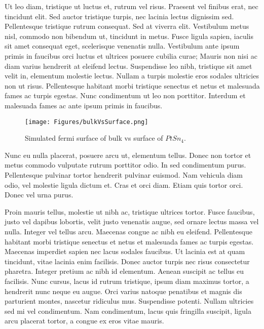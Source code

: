 Ut leo diam, tristique ut luctus et, rutrum vel risus. Praesent vel finibus erat, nec tincidunt elit. Sed auctor tristique turpis, nec lacinia lectus dignissim sed. Pellentesque tristique rutrum consequat. Sed at viverra elit. Vestibulum metus nisl, commodo non bibendum ut, tincidunt in metus. Fusce ligula sapien, iaculis sit amet consequat eget, scelerisque venenatis nulla. Vestibulum ante ipsum primis in faucibus orci luctus et ultrices posuere cubilia curae; Mauris non nisi ac diam varius hendrerit at eleifend lectus. Suspendisse leo nibh, tristique sit amet velit in, elementum molestie lectus. Nullam a turpis molestie eros sodales ultricies non ut risus. Pellentesque habitant morbi tristique senectus et netus et malesuada fames ac turpis egestas. Nunc condimentum ut leo non porttitor. Interdum et malesuada fames ac ante ipsum primis in faucibus.

    \begin{figure}
        \centering
        \texttt{[image: Figures/bulkVsSurface.png]}
        \caption{Simulated fermi surface of bulk vs surface of $PtSn_4$. }
        \label{fig:bulkvssurface}
    \end{figure}

Nunc eu nulla placerat, posuere arcu ut, elementum tellus. Donec non tortor et metus commodo vulputate rutrum porttitor odio. In sed condimentum purus. Pellentesque pulvinar tortor hendrerit pulvinar euismod. Nam vehicula diam odio, vel molestie ligula dictum et. Cras et orci diam. Etiam quis tortor orci. Donec vel urna purus.

Proin mauris tellus, molestie ut nibh ac, tristique ultrices tortor. Fusce faucibus, justo vel dapibus lobortis, velit justo venenatis augue, sed ornare lectus massa vel nulla. Integer vel tellus arcu. Maecenas congue ac nibh eu eleifend. Pellentesque habitant morbi tristique senectus et netus et malesuada fames ac turpis egestas. Maecenas imperdiet sapien nec lacus sodales faucibus. Ut lacinia est at quam tincidunt, vitae lacinia enim facilisis. Donec auctor turpis nec risus consectetur pharetra. Integer pretium ac nibh id elementum. Aenean suscipit ac tellus eu facilisis. Nunc cursus, lacus id rutrum tristique, ipsum diam maximus tortor, a hendrerit nunc neque eu augue. Orci varius natoque penatibus et magnis dis parturient montes, nascetur ridiculus mus. Suspendisse potenti. Nullam ultricies sed mi vel condimentum. Nam condimentum, lacus quis fringilla suscipit, ligula arcu placerat tortor, a congue ex eros vitae mauris.

